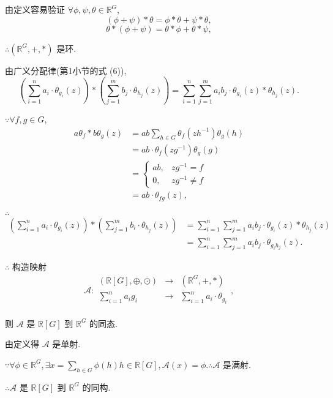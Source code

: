 \documentclass{ctexart}
\begin{document}
\begin{example}
    由定义容易验证 $\forall\phi,\psi,\theta\in\mathbb{R}^G$,
    \[(\phi+\psi)*\theta=\phi*\theta+\psi*\theta,\]
    \[\theta*(\phi+\psi)=\theta*\phi+\theta*\psi,\]

    $\therefore(\mathbb{R}^G,+,*)$ 是环.

    由广义分配律(第1小节的式 (6)),
    \[\left(\sum\limits_{i=1}^{n}a_i\cdot\theta_{g_i}(z)\right)*\left(\sum\limits_{j=1}^{m}b_j\cdot\theta_{h_j}(z)\right)=\sum\limits_{i=1}^{n}\sum\limits_{j=1}^{m}a_ib_j\cdot\theta_{g_i}(z)*\theta_{h_j}(z).\]

    $\because\forall f,g\in G$,
    \begin{align*}
        a\theta_f*b\theta_g(z) & =ab\sum\limits_{h\in G}\theta_f(zh^{-1})\theta_g(h) \\
        & =ab\cdot\theta_f(zg^{-1})\theta_g(g) \\
        & =\begin{cases}
                ab, & zg^{-1}=f \\
                0, & zg^{-1}\neq f
            \end{cases} \\
        & =ab\cdot\theta_{fg}(z),
    \end{align*}

    $\therefore$
    \begin{align*}
        \left(\sum\limits_{i=1}^{n}a_i\cdot\theta_{g_i}(z)\right)*\left(\sum\limits_{j=1}^{m}b_i\cdot\theta_{h_j}(z)\right) & =\sum\limits_{i=1}^{n}\sum\limits_{j=1}^{m}a_ib_j\cdot\theta_{g_i}(z)*\theta_{h_j}(z) \\
        & =\sum\limits_{i=1}^{n}\sum\limits_{j=1}^{m}a_ib_j\cdot\theta_{g_ih_j}(z).
    \end{align*}

    $\therefore$ 构造映射
    \[\mathscr{A}:\begin{array}{rcl}
        (\mathbb{R}[G],\oplus,\odot) & \to & (\mathbb{R}^G,+,*) \\
        \sum\limits_{i=1}^{n}a_ig_i & \to & \sum\limits_{i=1}^{n}a_i\cdot\theta_{g_i} \\
    \end{array},\]

    则 $\mathscr{A}$ 是 $\mathbb{R}[G]$ 到 $\mathbb{R}^G$ 的同态.

    由定义得 $\mathscr{A}$ 是单射.

    $\because\forall\phi\in\mathbb{R}^G,\exists x=\sum\limits_{h\in G}\phi(h)h\in\mathbb{R}[G],\mathscr{A}(x)=\phi.\therefore\mathscr{A}$ 是满射.

    $\therefore\mathscr{A}$ 是 $\mathbb{R}[G]$ 到 $\mathbb{R}^G$ 的同构.
\end{example}
\end{document}
